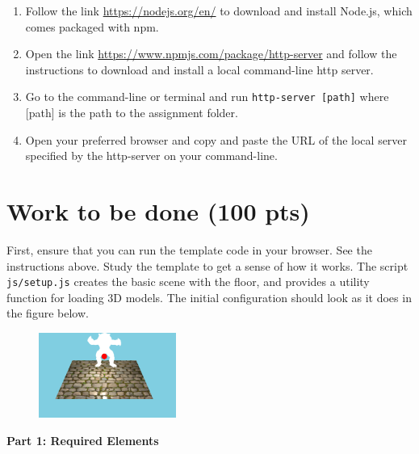\documentclass[12pt]{exam}
\begin{document}
\begin{enumerate}
    \item Follow the link \url{https://nodejs.org/en/} to download and install Node.js, which
        comes packaged with npm.
    \item Open the link \url{https://www.npmjs.com/package/http-server} and follow the
        instructions to download and install a local command-line http server.
    \item Go to the command-line or terminal and run {\tt http-server [path]}
        where [path] is the path to the assignment folder.
    \item Open your preferred browser and copy and paste the URL of the
        local server specified by the http-server on your command-line.
\end{enumerate}

\section{Work to be done (100 pts)}

First, ensure that you can run the template code in your browser. See
the instructions above. Study the template to get a sense of how it
works. The script {\tt js/setup.js} creates the basic scene with the floor, and provides a utility function for loading 3D models. The initial configuration should look as it does in the figure below.

\begin{figure}[H]
    \centering
    \includegraphics[width=0.4\textwidth]{./initial.png}
\end{figure}

{\bf Part 1: Required Elements}
\end{document}
